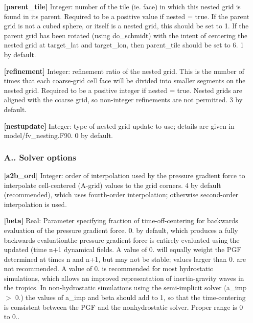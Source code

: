 {\bfseries \mbox{[}parent\+\_\+tile\mbox{]}} Integer\+: number of the tile (ie. face) in which this nested grid is found in its parent. Required to be a positive value if nested = true. If the parent grid is not a cubed sphere, or itself is a nested grid, this should be set to 1. If the parent grid has been rotated (using do\+\_\+schmidt) with the intent of centering the nested grid at target\+\_\+lat and target\+\_\+lon, then parent\+\_\+tile should be set to 6. 1 by default.

{\bfseries \mbox{[}refinement\mbox{]}} Integer\+: refinement ratio of the nested grid. This is the number of times that each coarse-\/grid cell face will be divided into smaller segments on the nested grid. Required to be a positive integer if nested = true. Nested grids are aligned with the coarse grid, so non-\/integer refinements are not permitted. 3 by default.

{\bfseries \mbox{[}nestupdate\mbox{]}} Integer\+: type of nested-\/grid update to use; details are given in model/fv\+\_\+nesting.\+F90. 0 by default.

\subsubsection*{A.. Solver options}

{\bfseries \mbox{[}a2b\+\_\+ord\mbox{]}} Integer\+: order of interpolation used by the pressure gradient force to interpolate cell-\/centered (A-\/grid) values to the grid corners. 4 by default (recommended), which uses fourth-\/order interpolation; otherwise second-\/order interpolation is used.

{\bfseries \mbox{[}beta\mbox{]}} Real\+: Parameter specifying fraction of time-\/off-\/centering for backwards evaluation of the pressure gradient force. 0. by default, which produces a fully backwards evaluationthe pressure gradient force is entirely evaluated using the updated (time {\ttfamily n+1} dynamical fields. A value of 0. will equally weight the P\+GF determined at times {\ttfamily n} and {\ttfamily n+1}, but may not be stable; values larger than 0. are not recommended. A value of 0. is recommended for most hydrostatic simulations, which allows an improved representation of inertia-\/gravity waves in the tropics. In non-\/hydrostatic simulations using the semi-\/implicit solver (a\+\_\+imp $>$ 0.) the values of a\+\_\+imp and beta should add to 1, so that the time-\/centering is consistent between the P\+GF and the nonhydrostatic solver. Proper range is 0 to 0..


